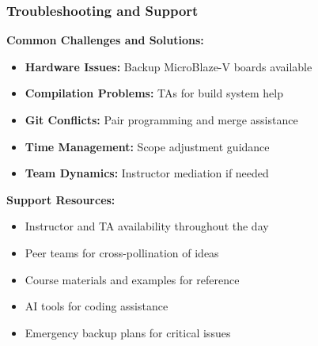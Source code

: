 \documentclass{beamer}
\begin{document}
\begin{frame}
\frametitle{Troubleshooting and Support}
\textbf{Common Challenges and Solutions:}
\begin{itemize}
    \item \textbf{Hardware Issues:} Backup MicroBlaze-V boards available
    \item \textbf{Compilation Problems:} TAs for build system help
    \item \textbf{Git Conflicts:} Pair programming and merge assistance
    \item \textbf{Time Management:} Scope adjustment guidance
    \item \textbf{Team Dynamics:} Instructor mediation if needed
\end{itemize}

\vspace{0.5cm}
\textbf{Support Resources:}
\begin{itemize}
    \item Instructor and TA availability throughout the day
    \item Peer teams for cross-pollination of ideas
    \item Course materials and examples for reference
    \item AI tools for coding assistance
    \item Emergency backup plans for critical issues
\end{itemize}
\end{frame}
\end{document}
